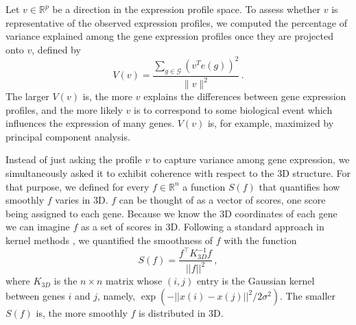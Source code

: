 Let $v\in\mathbb{R}^p$ be a direction in the expression profile space. To
assess whether $v$ is representative of the observed expression profiles, we computed
the percentage of variance explained among the gene expression profiles once
they are projected onto $v$, defined by
\begin{equation}\label{eq:variance}
V(v) = \frac{\sum_{g \in \mathcal{G}} \left(v^T e(g)\right)^2}{\|v\|^2}\,.
\end{equation}
The larger $V(v)$ is, the more $v$ explains the differences between gene
expression profiles, and the more likely $v$ is to correspond to some
biological event which influences the expression of many genes. $V(v)$ is, for
example, maximized by principal component analysis.

Instead of just asking the profile $v$ to capture variance among gene expression, we
simultaneously asked it to exhibit coherence with respect to the 3D structure.
For that purpose, we defined for every $f\in\mathbb{R}^n$ a function $S(f)$
that quantifies how smoothly $f$ varies in 3D. $f$ can be thought of as a
vector of scores, one score being assigned to each gene.  Because we know the
3D coordinates of each gene we can imagine $f$ as a set of scores in 3D.
Following a standard approach in kernel methods \citep{scholkopf:learning}, we
quantified the smoothness of $f$ with the function
\begin{equation}\label{eq:smoothness}
S(f) = \frac{f^\top K^{-1}_{3D} f}{||f||^2}\,,
\end{equation}
where $K_{3D}$ is the $n\times n$ matrix whose $(i,j)$ entry is the Gaussian
kernel between genes $i$ and $j$, namely, $\exp\left(-||x(i) - x(j)||^2 /
2\sigma^2\right)$. The smaller $S(f)$ is, the more smoothly $f$ is distributed
in 3D.

